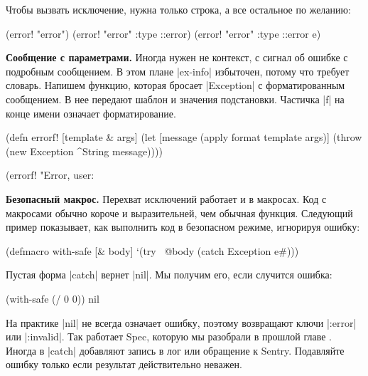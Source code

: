Чтобы вызвать исключение, нужна только строка, а все остальное по желанию:

\begin{english}
  \begin{clojure}
(error! "error")
(error! "error" {:type ::error})
(error! "error" {:type ::error} e)
  \end{clojure}
\end{english}

\textbf{Сообщение с параметрами.} Иногда нужен не контекст, с сигнал об ошибке с
подробным сообщением. В этом плане \spverb|ex-info| избыточен, потому что
требует словарь. Напишем функцию, которая бросает \spverb|Exception| с
форматированным сообщением. В нее передают шаблон и значения
подстановки. Частичка \spverb|f| на конце имени означает форматирование.

\begin{english}
  \begin{clojure}
(defn errorf! [template & args]
  (let [message (apply format template args)]
    (throw (new Exception ^String message))))

(errorf! "Error, user: %
  \end{clojure}
\end{english}

\textbf{Безопасный макрос.} Перехват исключений работает и в макросах. Код с
макросами обычно короче и выразительней, чем обычная функция. Следующий пример
показывает, как выполнить код в безопасном режиме, игнорируя ошибку:

\begin{english}
  \begin{clojure}
(defmacro with-safe [& body]
  `(try
     ~@body
     (catch Exception e#)))
  \end{clojure}
\end{english}

Пустая форма \spverb|catch| вернет \spverb|nil|. Мы получим его, если случится
ошибка:

\begin{english}
  \begin{clojure}
(with-safe (/ 0 0))
nil
  \end{clojure}
\end{english}

На практике \spverb|nil| не всегда означает ошибку, поэтому возвращают ключи
\spverb|:error| или \spverb|:invalid|. Так работает Spec, которую мы разобрали в
прошлой главе . Иногда в \spverb|catch| добавляют запись в
лог или обращение к Sentry. Подавляйте ошибку только если результат
действительно неважен.

